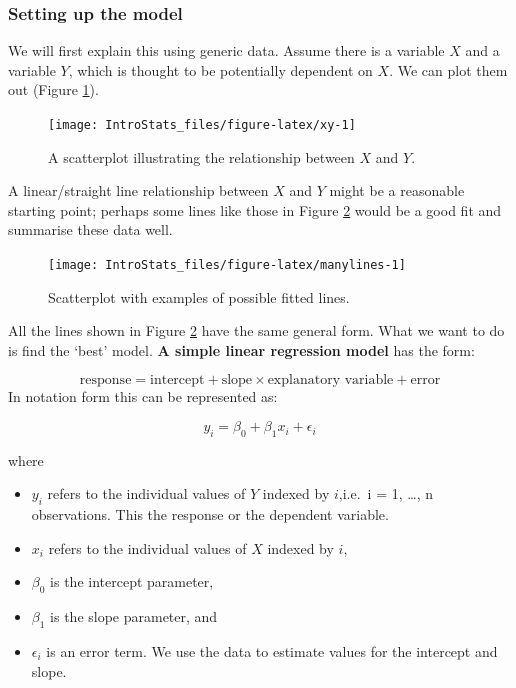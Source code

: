 \documentclass[
  oneside]{krantz}
\providecommand{\tightlist}{%
  \setlength{\itemsep}{0pt}\setlength{\parskip}{0pt}}
\begin{document}
\hypertarget{setting-up-the-model}{%
\subsubsection{Setting up the model}\label{setting-up-the-model}}

We will first explain this using generic data. Assume there is a variable \(X\) and a variable \(Y\),
which is thought to be potentially dependent on \(X\). We can plot them out (Figure \ref{fig:xy}).

\begin{figure}

{\centering \texttt{[image: IntroStats\_files/figure-latex/xy-1]} 

}

\caption{A scatterplot illustrating the relationship between $X$ and $Y$.}\label{fig:xy}
\end{figure}

\newpage

A linear/straight line relationship between \(X\) and \(Y\) might be a reasonable starting point; perhaps some lines like those in Figure \ref{fig:manylines} would be a good fit and summarise these data well.

\begin{figure}

{\centering \texttt{[image: IntroStats\_files/figure-latex/manylines-1]} 

}

\caption{Scatterplot with examples of possible fitted lines.}\label{fig:manylines}
\end{figure}

All the lines shown in Figure \ref{fig:manylines} have the same general form. What we want to do is find the `best' model. \textbf{A simple linear regression model} has the form:

\[\textrm{response} = \textrm{intercept} + \textrm{slope} \times \textrm{explanatory variable} + \textrm{error}\]
In notation form this can be represented as:

\[y_i = \beta_0 + \beta_1 x_i + \epsilon_i\]

where

\begin{itemize}
\tightlist
\item
  \(y_i\) refers to the individual values of \(Y\) indexed by \(i\),i.e.~i = 1, \ldots, n observations. This the response or the dependent variable.
\item
  \(x_i\) refers to the individual values of \(X\) indexed by \(i\),\\
\item
  \(\beta_0\) is the intercept parameter,
\item
  \(\beta_1\) is the slope parameter, and
\item
  \(\epsilon_i\) is an error term.
  We use the data to estimate values for the intercept and slope.
\end{itemize}
\end{document}

